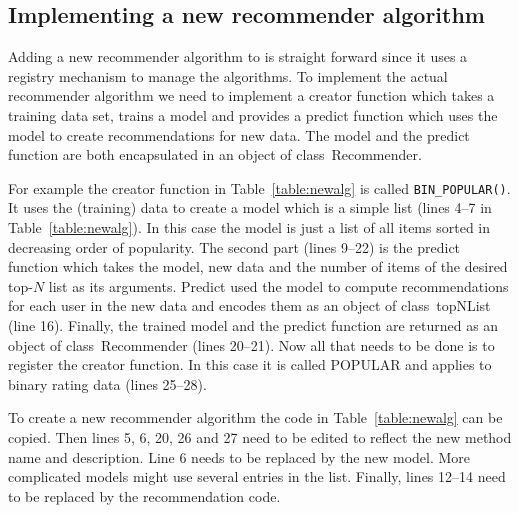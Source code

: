 \documentclass[nojss]{jss}
\newcommand{\class}[1]{\mbox{\textsf{#1}}}
\newcommand{\func}[1]{\mbox{\texttt{#1()}}}
\begin{document}
\subsection{Implementing a new recommender algorithm}

Adding a new recommender algorithm to 
is straight forward since
it uses a registry mechanism to manage the algorithms.
To implement the actual recommender algorithm
we need to implement a creator function which takes a training data set,
trains a model and provides a predict function which uses the
model to create recommendations for new data.
The model and the predict function are both encapsulated in an
object of class~\class{Recommender}.

For example the creator function
in Table~\ref{table:newalg} is called \func{BIN\_POPULAR}. It uses
the (training) data to create a model which is a simple list (lines 4--7 in
Table~\ref{table:newalg}).
In this case the model is just a list of all items sorted in
decreasing order of
popularity.
The second part (lines 9--22) is the predict function which
takes the model, new data and
the number of items of the desired top-$N$ list as its arguments.
Predict used the model to compute recommendations for
each user in the new data and
encodes them as an object of class~\class{topNList} (line 16).
Finally, the trained model and the predict function are returned as
an object of class~\class{Recommender} (lines 20--21).
Now all that needs to be done is to register the creator function. In this case
it is called POPULAR and applies to binary rating data (lines 25--28).

To create a new recommender algorithm the code in Table~\ref{table:newalg}
can be copied. Then lines 5, 6, 20, 26 and 27 need
to be edited to reflect the new method name and description.
Line 6 needs to be replaced by the new model. More complicated
models might use several entries in the list. Finally,
lines 12--14 need to be replaced by the recommendation code.
\end{document}
